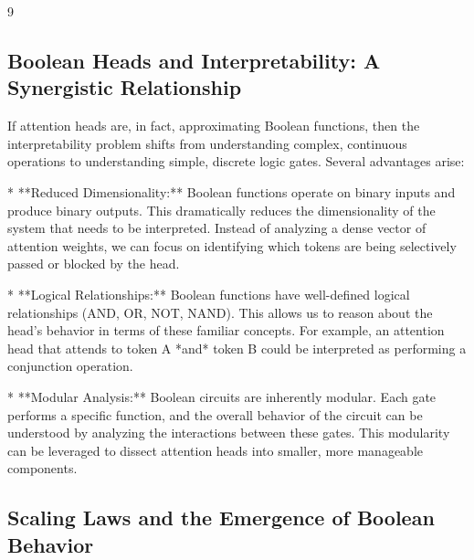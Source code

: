 \documentclass[11pt]{article}
\theoremstyle{definition}
\begin{document}
\begin{thebibliography}{9}
\subsection{Boolean Heads and Interpretability: A Synergistic Relationship}













If attention heads are, in fact, approximating Boolean functions, then the interpretability problem shifts from understanding complex, continuous operations to understanding simple, discrete logic gates. Several advantages arise:













*   **Reduced Dimensionality:** Boolean functions operate on binary inputs and produce binary outputs. This dramatically reduces the dimensionality of the system that needs to be interpreted.  Instead of analyzing a dense vector of attention weights, we can focus on identifying which tokens are being selectively passed or blocked by the head.






*   **Logical Relationships:** Boolean functions have well-defined logical relationships (AND, OR, NOT, NAND). This allows us to reason about the head's behavior in terms of these familiar concepts.  For example, an attention head that attends to token A *and* token B could be interpreted as performing a conjunction operation.






*   **Modular Analysis:** Boolean circuits are inherently modular.  Each gate performs a specific function, and the overall behavior of the circuit can be understood by analyzing the interactions between these gates.  This modularity can be leveraged to dissect attention heads into smaller, more manageable components.













\subsection{Scaling Laws and the Emergence of Boolean Behavior}














\end{thebibliography}
\end{document}
